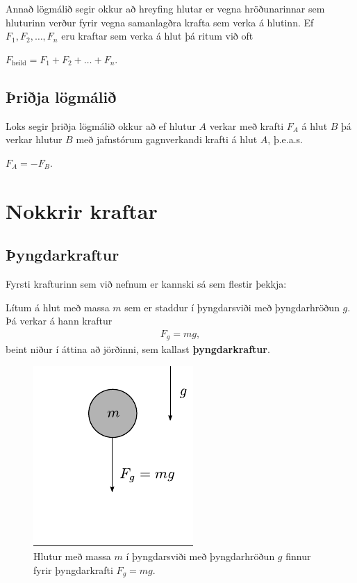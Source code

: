 Annað lögmálið segir okkur að hreyfing hlutar er vegna hröðunarinnar sem hluturinn verður fyrir vegna samanlagðra krafta sem verka á hlutinn. Ef $F_1, F_2, \ldots, F_n$ eru kraftar sem verka á hlut þá ritum við oft
\begin{center}
\begin{tcbox}[nobeforeafter]{$F_{\text{heild}} = F_1 + F_2 + \ldots + F_n.$}
\end{tcbox}
\end{center}

\subsection*{Þriðja lögmálið}

Loks segir þriðja lögmálið okkur að ef hlutur $A$ verkar með krafti $F_A$ á hlut $B$ þá verkar hlutur $B$ með jafnstórum gagnverkandi krafti á hlut $A$, þ.e.a.s.
\begin{center}
\begin{tcbox}[nobeforeafter]{$F_A = -F_B.$}
\end{tcbox}
\end{center}

\section{Nokkrir kraftar}

\subsection*{Þyngdarkraftur}

Fyrsti krafturinn sem við nefnum er kannski sá sem flestir þekkja:

\begin{tcolorbox}
\begin{definition}
    Lítum á hlut með massa $m$ sem er staddur í þyngdarsviði með þyngdarhröðun $g$. Þá verkar á hann kraftur
    \begin{align*}
        F_g = mg,
    \end{align*}
    beint niður í áttina að jörðinni, sem kallast \textbf{þyngdarkraftur}.
\end{definition}
\end{tcolorbox}

\begin{figure}[H]
    \centering
    \includegraphics{figures/mg.pdf}
    \caption{Hlutur með massa $m$ í þyngdarsviði með þyngdarhröðun $g$ finnur fyrir þyngdarkrafti $F_g = mg$.}
    \label{fig:stoduorka}
\end{figure}

